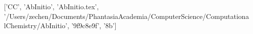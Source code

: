 ['CC', 'AbInitio', 'AbInitio.tex', '/Users/zechen/Documents/PhantasiaAcademia/ComputerScience/ComputationalChemistry/AbInitio', '\x9f\xba{}\x9c\xac{}\x8e\x9f', '\xae{}\xbe\x8b']
